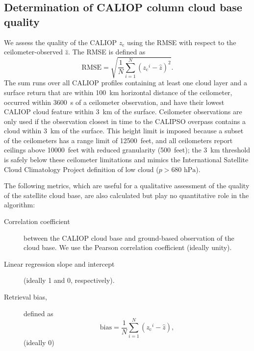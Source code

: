 \documentclass[essd,manuscript]{copernicus}\usepackage[]{graphicx}\usepackage[]{color}
\newcommand\CBHc{\ensuremath{z_\text{c}}}
\begin{document}
\subsection{Determination of CALIOP column cloud base quality}
\label{sec:algorithm:qual}
We assess the quality of the CALIOP \CBHc{} using the RMSE with respect to the
ceilometer-observed $\hat{z}$.  The RMSE is defined as
\begin{equation}
  \label{eq:rmse}
  \text{RMSE} = \sqrt{\frac{1}{N}\sum\limits_{i = 1}^{N}\left(\CBHc^i - \hat{z}\right)^2}.
\end{equation}
The sum runs over all CALIOP profiles containing at least one cloud layer and a
surface return that are within 100~km horizontal distance of the ceilometer,
occurred within 3600~s of a ceilometer observation, and have their lowest CALIOP
cloud feature within 3~km of the surface.  Ceilometer observations are only used
if the observation closest in time to the CALIPSO overpass contains a cloud
within 3~km of the surface.  This height limit is imposed because a subset of
the ceilometers has a range limit of 12500~feet, and all ceilometers report
ceilings above 10000~feet with reduced granularity (500~feet); the 3~km
threshold is safely below these ceilometer limitations and mimics the
International Satellite Cloud Climatology Project \citep[ISCCP,][]{Rossow1999}
definition of low cloud ($p > 680\text{ hPa}$).

The following metrics, which are useful for a qualitative assessment of the
quality of the satellite cloud base, are also calculated but play no
quantitative role in the algorithm:
\begin{description}
\item[Correlation coefficient] between the CALIOP cloud base and ground-based
  observation of the cloud base.  We use the Pearson correlation coefficient
  (ideally unity).  
\item[Linear regression slope and intercept] (ideally 1 and 0, respectively).  
\item[Retrieval bias,] defined as
  \begin{equation}
    \label{eq:bias}
    \mbox{bias} = \frac{1}{N}\sum\limits_{i = 1}^{N}\left(\CBHc^i - \hat{z}\right),
  \end{equation}(ideally 0)
\end{description}
\end{document}
